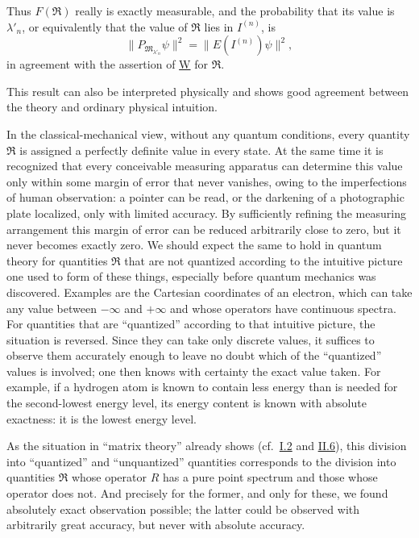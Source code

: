 \documentclass[fontsize=13pt,twoside,openany,headings=normal,parskip=false,bookmarkpackage=false,DIV=calc]{scrbook}
\begin{document}
Thus $F(\mathfrak R)$ really is exactly measurable, and the probability that its value is $\lambda'_n$, or equivalently that the value of $\mathfrak R$ lies in $I^{(n)}$, is
\[
\|P_{\mathfrak M_{\lambda'_n}}\psi\|^2=\|E(I^{(n)})\psi\|^2,
\]
in agreement with the assertion of \hyperref[post:III.1.W]{W} for $\mathfrak R$.

This result can also be interpreted physically and shows good agreement between the theory and ordinary physical intuition.

In the classical-mechanical view, without any quantum conditions, every quantity $\mathfrak R$ is assigned a perfectly definite value in every state. At the same time it is recognized that every conceivable measuring apparatus can determine this value only within some margin of error that never vanishes, owing to the imperfections of human observation: a pointer can be read, or the darkening of a photographic plate localized, only with limited accuracy. By sufficiently refining the measuring arrangement this margin of error can be reduced arbitrarily close to zero, but it never becomes exactly zero. We should expect the same to hold in quantum theory for quantities $\mathfrak R$ that are not quantized according to the intuitive picture one used to form of these things, especially before quantum mechanics was discovered. Examples are the Cartesian coordinates of an electron, which can take any value between $-\infty$ and $+\infty$ and whose operators have continuous spectra. For quantities that are ``quantized'' according to that intuitive picture, the situation is reversed. Since they can take only discrete values, it suffices to observe them accurately enough to leave no doubt which of the ``quantized'' values is involved; one then knows with certainty the exact value taken. For example, if a hydrogen atom is known to contain less energy than is needed for the second-lowest energy level, its energy content is known with absolute exactness: it is the lowest energy level.

\hypertarget{origpage-117}{}%
As the situation in ``matrix theory'' already shows (cf.\ \hyperref[sec:I.2]{I.2} and \hyperref[sec:II.6]{II.6}), this division into ``quantized'' and ``unquantized'' quantities corresponds to the division into quantities $\mathfrak R$ whose operator $R$ has a pure point spectrum and those whose operator does not. And precisely for the former, and only for these, we found absolutely exact observation possible; the latter could be observed with arbitrarily great accuracy, but never with absolute accuracy.
\end{document}
